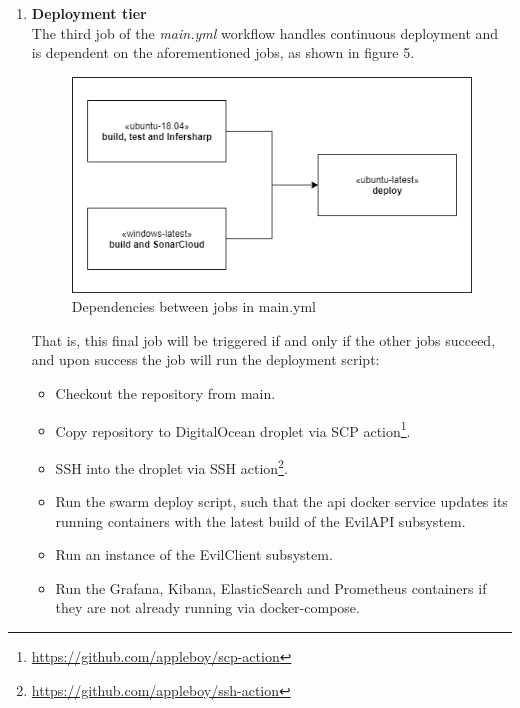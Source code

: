 \documentclass[report/main.tex]{subfiles}
\begin{document}
\begin{enumerate}
\begin{itemize}
            \end{itemize}
            
            Both of these jobs run concurrently and utilise the dotnet action\footnote{\hyperlink{dotnet action}{https://github.com/actions/setup-dotnet}} with dotnet version 5.0.102 to mirror the dotnet environment in production. 
            
            
            \item \textbf{Deployment tier} \\
            The third job of the \textit{main.yml} workflow handles continuous deployment and is dependent on the aforementioned jobs, as shown in figure 5. 
            
            \begin{figure}[H]
            \centering
                \includegraphics[width=\textwidth/2]{report/images/EvilTwitter-main-final.png}
                \caption{Dependencies between jobs in main.yml}
            \label{fig:main_workflow}
            \end{figure}
            
            That is, this final job will be triggered if and only if the other jobs succeed, and upon success the job will run the deployment script:
            
            \begin{itemize}
                \item Checkout the repository from main. 
                \item Copy repository to DigitalOcean droplet via SCP action\footnote{\hyperlink{scp action}{https://github.com/appleboy/scp-action}}. 
                \item SSH into the droplet via SSH action\footnote{\hyperlink{ssh action}{https://github.com/appleboy/ssh-action}}.
                \item Run the swarm deploy script, such that the api docker service updates its running containers with the latest build of the EvilAPI subsystem. 
                \item Run an instance of the EvilClient subsystem. 
                \item Run the Grafana, Kibana, ElasticSearch and Prometheus containers if they are not already running via docker-compose.  
            \end{itemize}
            

\end{enumerate}
\end{document}

